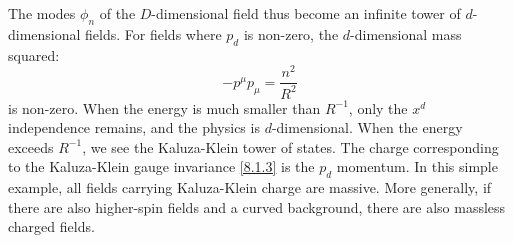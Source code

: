 The modes $\phi_{n}$ of the $D$-dimensional field thus become an infinite tower of $d$-dimensional fields. For fields where $p_{d} $ is non-zero, the $d$-dimensional mass squared:
\begin{equation}
	-p^{\mu} p_{\mu}=\frac{n^{2}}{R^{2}} \label{8.1.7}
\end{equation}
is non-zero. When the energy is much smaller than $R^{-1}$, only the $x^{d}$ independence remains, and the physics is $d$-dimensional. When the energy exceeds $R^{-1}$, we see the Kaluza-Klein tower of states.
The charge corresponding to the Kaluza-Klein gauge invariance \eqref{8.1.3} is the $p_{d}$ momentum. In this simple example, all fields carrying Kaluza-Klein charge are massive. 
More generally, if there are also higher-spin fields and a curved background, there are also massless charged fields.

